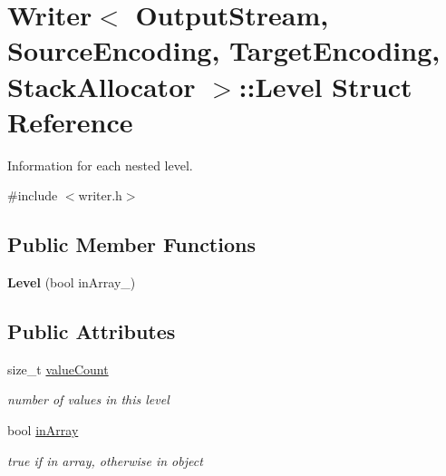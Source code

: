 \hypertarget{struct_writer_1_1_level}{}\section{Writer$<$ Output\+Stream, Source\+Encoding, Target\+Encoding, Stack\+Allocator $>$\+:\+:Level Struct Reference}
\label{struct_writer_1_1_level}


Information for each nested level.  




{\ttfamily \#include $<$writer.\+h$>$}

\subsection*{Public Member Functions}
\begin{DoxyCompactItemize}
\item 
\hypertarget{struct_writer_1_1_level_a4c9d2a6336d707725cd749b80059e59d}{}{\bfseries Level} (bool in\+Array\+\_\+)\label{struct_writer_1_1_level_a4c9d2a6336d707725cd749b80059e59d}

\end{DoxyCompactItemize}
\subsection*{Public Attributes}
\begin{DoxyCompactItemize}
\item 
\hypertarget{struct_writer_1_1_level_a01214721e4001d997f3057d26edba9a0}{}size\+\_\+t \hyperlink{struct_writer_1_1_level_a01214721e4001d997f3057d26edba9a0}{value\+Count}\label{struct_writer_1_1_level_a01214721e4001d997f3057d26edba9a0}

\begin{DoxyCompactList}\small\item\em number of values in this level \end{DoxyCompactList}\item 
\hypertarget{struct_writer_1_1_level_aa188a24842bcadebcd037ab852b978bb}{}bool \hyperlink{struct_writer_1_1_level_aa188a24842bcadebcd037ab852b978bb}{in\+Array}\label{struct_writer_1_1_level_aa188a24842bcadebcd037ab852b978bb}

\begin{DoxyCompactList}\small\item\em true if in array, otherwise in object \end{DoxyCompactList}\end{DoxyCompactItemize}



